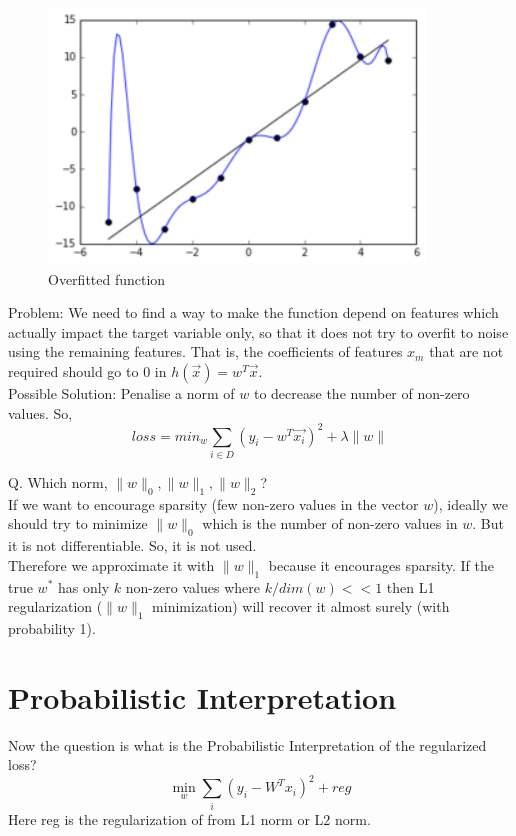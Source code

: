 \documentclass[11pt, twosides]{article}
\begin{document}
\begin{figure}[h]
    \centering
    \includegraphics[width = 10cm]{Overfitted_Data.png}
    \caption{Overfitted function}
\end{figure}

Problem: We need to find a way to make the function depend on features which actually impact the target variable only, so that it does not try to overfit to noise using the remaining features. That is, the coefficients of features $x_m$ that are not required should go to $0$ in $h(\overrightarrow{x}) = w^T\overrightarrow{x}$.\\
Possible Solution: Penalise a norm of $w$ to decrease the number of non-zero values. So, $$loss = min_w \sum_{i \in D} (y_i-w^T\overrightarrow{x_i})^2 + \lambda \|w\|$$
\begin{flushleft}
Q. Which norm, $\|w\|_0, \|w\|_1, \|w\|_2$?\\
\color{blue}
If we want to encourage sparsity (few non-zero values in the vector $w$), ideally we should try to minimize $\|w\|_0$ which is the number of non-zero values in $w$. But it is not differentiable. So, it is not used.\\
Therefore we approximate it with $\|w\|_1$ because it encourages sparsity. If the true $w^*$ has only $k$ non-zero values where $k/dim(w) << 1$ then L1 regularization ($\|w\|_1$ minimization) will recover it almost surely (with probability 1).
\end{flushleft}


\section{Probabilistic Interpretation}

Now the question is what is the Probabilistic Interpretation of the regularized loss?
$$\min_w \sum_i (y_i - W^Tx_i)^2 + reg$$
Here reg is the regularization of from L1 norm or L2 norm.\\
\end{document}
